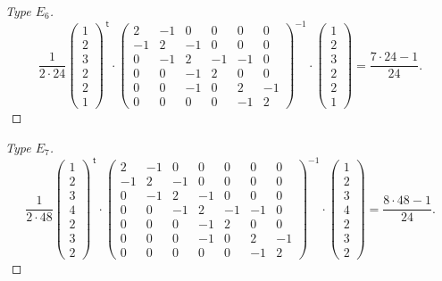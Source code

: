 \documentclass{article}
\theoremstyle{definition}
\renewcommand{\top}{\,\mathsf{t}}
\begin{document}
\begin{proof}[Type $E_6$]
	
	
	\[
	\frac{1}{2\cdot 24}
	\begin{pmatrix}
	1 \\ 2 \\ 3 \\ 2 \\ 2 \\ 1
	\end{pmatrix}^{\top}
	\cdot
	\begin{pmatrix}
	2 & -1 & 0 & 0 & 0 & 0 \\
	-1 & 2 & -1 & 0 & 0 & 0\\
	0 & -1 & 2 & -1 & -1 & 0 \\
	0 & 0 & -1 & 2 & 0 & 0 \\
	0 & 0 & -1 & 0 & 2 & -1 \\
	0 & 0 & 0 & 0 & -1 & 2
	\end{pmatrix}^{-1}
	\cdot
	\begin{pmatrix}
	1 \\ 2 \\ 3 \\ 2 \\ 2 \\ 1
	\end{pmatrix}
	=\frac{7\cdot 24-1}{24}.
	\]
\end{proof}

\begin{proof}[Type $E_7$]
	\[ 
	\frac{1}{2\cdot 48}
	\begin{pmatrix}
	1 \\ 2 \\ 3 \\ 4 \\2  \\ 3 \\ 2
	\end{pmatrix}^{\top}
	\cdot
	\begin{pmatrix}
	2 & -1 & 0 & 0 & 0 & 0 & 0 \\
	-1 & 2 & -1 & 0 & 0 & 0 & 0\\
	0 & -1 & 2 & -1 & 0 & 0 & 0 \\
	0 & 0 & -1 & 2 & -1 & -1 & 0 \\
	0 & 0 & 0 & -1 & 2 & 0 & 0 \\
	0 & 0 & 0 & -1 & 0 & 2 & -1 \\
	0 & 0 & 0 & 0  & 0 & -1 & 2
	\end{pmatrix}^{-1}
	\cdot
	\begin{pmatrix}
	1 \\ 2 \\ 3 \\ 4 \\2  \\ 3 \\ 2
	\end{pmatrix}
	=\frac{8\cdot 48-1}{24}.
	\]
\end{proof}
\end{document}
